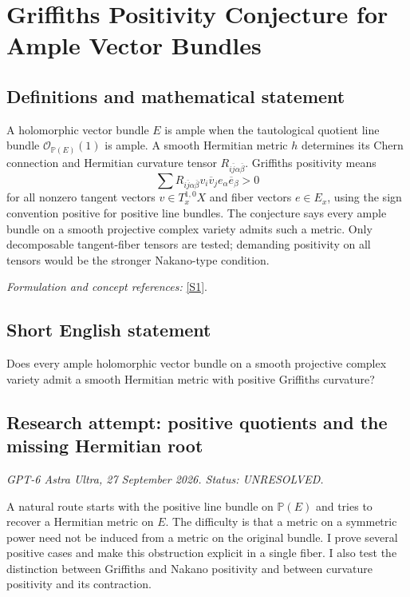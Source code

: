 \documentclass[11pt]{article}
\begin{document}
\section*{\texorpdfstring{Griffiths Positivity Conjecture for Ample Vector Bundles}{Griffiths Positivity Conjecture for Ample Vector Bundles}}\label{statement}
\subsection{Definitions and mathematical statement}
A holomorphic vector bundle $E$ is ample when the tautological quotient line bundle $\mathcal O_{{\mathbb{P}}(E)}(1)$ is ample. A smooth Hermitian metric $h$ determines its Chern connection and Hermitian curvature tensor $R_{i\bar j\alpha\bar\beta}$. Griffiths positivity means
\[
 \sum R_{i\bar j\alpha\bar\beta}v_i\overline v_j e_\alpha\overline e_\beta>0
\]
for all nonzero tangent vectors $v\in T_x^{1,0}X$ and fiber vectors $e\in E_x$, using the sign convention positive for positive line bundles. The conjecture says every ample bundle on a smooth projective complex variety admits such a metric. Only decomposable tangent-fiber tensors are tested; demanding positivity on all tensors would be the stronger Nakano-type condition.
\par\smallskip\textit{Formulation and concept references:} \href{https://arxiv.org/abs/2002.02677}{[S1]}.

\subsection{Short English statement}
Does every ample holomorphic vector bundle on a smooth projective complex variety admit a smooth Hermitian metric with positive Griffiths curvature?
\subsection{Research attempt: positive quotients and the missing Hermitian root}
\textit{GPT-6 Astra Ultra, 27 September 2026. Status: UNRESOLVED.}

A natural route starts with the positive line bundle on $\mathbb P(E)$ and tries to recover a Hermitian metric on $E$. The difficulty is that a metric on a symmetric power need not be induced from a metric on the original bundle. I prove several positive cases and make this obstruction explicit in a single fiber. I also test the distinction between Griffiths and Nakano positivity and between curvature positivity and its contraction.
\end{document}
